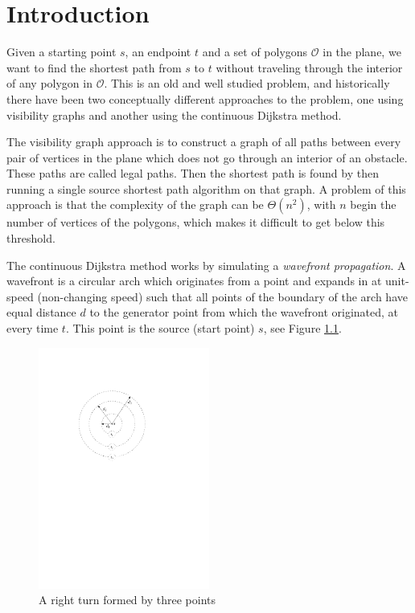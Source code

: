 \chapter{Introduction} 
Given a starting point $s$, an endpoint $t$ and a set of
polygons $\mathcal{O}$ in the plane, we want to find the shortest path from $s$ to $t$ 
without traveling through the interior of any polygon in $\mathcal{O}$. 
This is an old and well studied problem, and historically there have been two
conceptually different approaches to the problem, one using visibility graphs and
another using the continuous Dijkstra method. 

The visibility graph approach is to construct a graph of all paths between every pair 
of vertices in the plane which does not go through an interior of an obstacle. 
These paths are called legal paths. Then the shortest path is found by then running a 
single source shortest path algorithm on that graph. A problem of this approach
is that the complexity of the graph can be $\Theta(n^2)$, with $n$ begin the number of vertices of the polygons,
which makes it difficult to get below this threshold. 

The continuous Dijkstra method works by simulating a \emph{wavefront propagation}.
A wavefront is a circular arch which originates from a point and expands in at unit-speed
(non-changing speed) such that all points of the boundary of the arch have equal distance 
$d$ to the generator point from which the wavefront originated, at every time $t$. 
This point is the source (start point) $s$, see Figure \ref{fig:simplewavefront}.

\begin{figure}[H]
    \centering
	\includegraphics[width=0.5\textwidth]{figures/simplewavefront.pdf}
	\caption{A right turn formed by three points}
    \label{fig:simplewavefront}
\end{figure}

